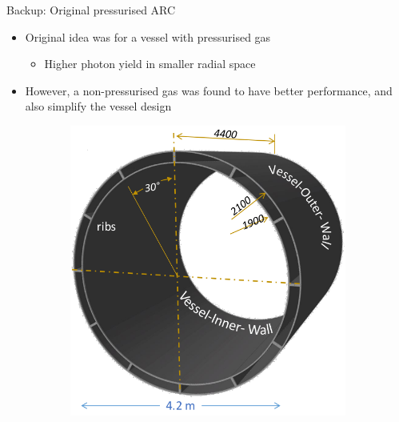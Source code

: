 \documentclass{beamer}
\begin{document}
\begin{frame}{Backup: Original pressurised ARC}
  \begin{itemize}
    \setlength\itemsep{0.5em}
    \item{Original idea was for a vessel with pressurised gas}
    \begin{itemize}
      \item{Higher photon yield in smaller radial space}
    \end{itemize}
    \item{However, a non-pressurised gas was found to have better performance, and also simplify the vessel design}
  \end{itemize}
  \begin{figure}
    \centering
    \begin{subfigure}{0.35\textwidth}
      \includegraphics[width = 1.0\textwidth]{Plots/CarbonFiberVessel.png}
    \end{subfigure}%
    \hspace{0.7cm}
    \begin{subfigure}{0.35\textwidth}

\end{subfigure}
\end{figure}
\end{frame}
\end{document}
